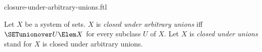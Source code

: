 \documentclass{stex}
\begin{document}
\begin{smodule}{closure-under-arbitrary-unions.ftl}

\begin{definition}[forthel,for={closed under arbitrary unions,closed under unions}]
  Let $X$ be a system of sets.
  $X$ is \emph{closed under arbitrary unions} iff $\SETunionover U \Elem X$ for every  subclass $U$ of $X$.
  Let $X$ is \emph{closed under unions} stand for $X$ is closed under arbitrary unions.
\end{definition}
\end{smodule}
\end{document}

